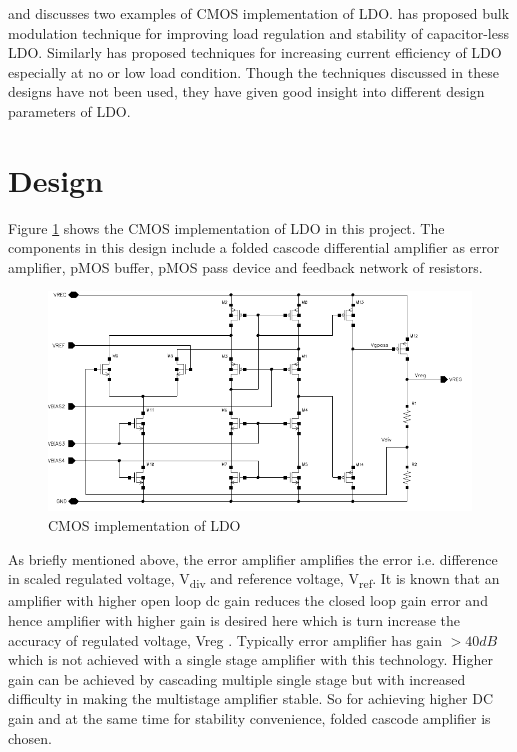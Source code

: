 \documentclass[12pt,a4paper,UKenglish]{report}
\begin{document}
\cite{ldo_bulkmod} and \cite{ldo_quiescent} discusses two examples of CMOS implementation of LDO. \cite{ldo_bulkmod} 
has proposed bulk modulation technique for improving load regulation and stability of capacitor-less LDO. 
Similarly \cite{ldo_quiescent} has  proposed techniques for increasing current efficiency of LDO especially at 
no or low load condition. Though the techniques discussed in these designs have not been used, they have given 
good insight into different design parameters of LDO.  \\

\section{Design}		%

Figure \ref{fig:ldo_cmos} shows the CMOS implementation of LDO in this project. The components in this design 
include a folded cascode differential amplifier as error amplifier, pMOS buffer, pMOS pass device and feedback 
network of resistors. \\

\begin{figure}[htbp] %
   \centering
  \includegraphics[width=\textwidth]{img/ldo_schematic.pdf} 
   \caption{CMOS implementation of LDO}
   \label{fig:ldo_cmos}
\end{figure}

As briefly mentioned above, the error amplifier amplifies the error i.e. difference in scaled regulated voltage, 
V\textsubscript{div} and reference voltage, V\textsubscript{ref}. It is known that an amplifier with higher 
open loop \acrshort{dc} gain reduces the closed loop gain error and hence amplifier with higher gain is desired 
here which is turn increase the accuracy of regulated voltage, Vreg \cite{ldo_bulkmod}. Typically error amplifier 
has gain $> 40 dB$ which is not achieved with a single stage amplifier with this technology. Higher gain can be 
achieved by cascading multiple single stage but with increased difficulty in making the multistage
amplifier stable. So for achieving higher DC gain and at the same time for stability convenience, folded cascode 
amplifier \cite[pp. xx]{razavi_2001} is chosen. \\
\end{document}
